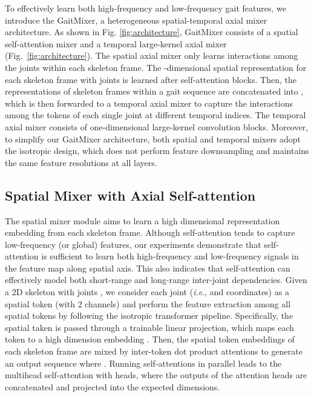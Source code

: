 \documentclass{article}
\begin{document}
To effectively learn both high-frequency and low-frequency gait features, we introduce the GaitMixer, a heterogeneous spatial-temporal axial mixer architecture. As shown in Fig.  \ref{fig:architecture}, GaitMixer consists of a spatial self-attention mixer and a temporal large-kernel axial mixer (Fig.~\ref{fig:architecture}). The spatial axial mixer only learns interactions among the joints within each skeleton frame. The -dimensional spatial representation  for each skeleton frame  with  joints is learned after  self-attention blocks. Then, the representations of  skeleton frames within a gait sequence are concatenated into , which is then forwarded to a temporal axial mixer to capture the interactions among the tokens of each single joint at different temporal indices. The temporal axial mixer consists of  one-dimensional large-kernel convolution blocks. Moreover, to simplify our GaitMixer architecture, both spatial and temporal mixers adopt the isotropic design, which does not perform feature downsampling and maintains the same feature resolutions at all layers.


\subsection{Spatial Mixer with Axial Self-attention}




The spatial mixer module aims to learn a high dimensional representation embedding
from each skeleton frame. Although self-attention tends to capture low-frequency (or global) features, our experiments demonstrate that self-attention is sufficient to learn both high-frequency and low-frequency signals in the feature map along spatial axis. This also indicates that self-attention can effectively model both short-range and long-range inter-joint dependencies. Given a 2D skeleton with joints , we consider each joint (\emph{i.e}.,  and  coordinates) as a spatial token (with 2 channels) and perform the feature extraction among all  spatial tokens by following the isotropic transformer pipeline. Specifically, the spatial taken   is passed through a trainable linear projection, which maps each token to a high dimension embedding . Then, the spatial token embeddings of each skeleton frame  are mixed by inter-token dot product attentions to generate an output sequence  where . Running  self-attentions in parallel leads to the multihead self-attention with  heads, where the outputs of the attention heads are concatenated and projected into the expected dimensions.
\end{document}
